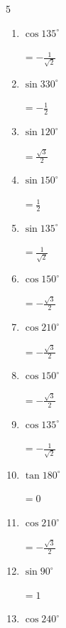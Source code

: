 \begin{multicols}{5}
\begin{enumerate}
  \item $\displaystyle \cos{135^\circ}$

        $\displaystyle =-\frac{1}{\sqrt{2}}$

  \item $\displaystyle \sin{330^\circ}$

        $\displaystyle =-\frac{1}{2}$

  \item $\displaystyle \sin{120^\circ}$

        $\displaystyle =\frac{\sqrt{3}}{2}$

  \item $\displaystyle \sin{150^\circ}$

        $\displaystyle =\frac{1}{2}$

  \item $\displaystyle \sin{135^\circ}$

        $\displaystyle =\frac{1}{\sqrt{2}}$

  \item $\displaystyle \cos{150^\circ}$

        $\displaystyle =-\frac{\sqrt{3}}{2}$

  \item $\displaystyle \cos{210^\circ}$

        $\displaystyle =-\frac{\sqrt{3}}{2}$

\columnbreak %

  \item $\displaystyle \cos{150^\circ}$

        $\displaystyle =-\frac{\sqrt{3}}{2}$

  \item $\displaystyle \cos{135^\circ}$

        $\displaystyle =-\frac{1}{\sqrt{2}}$

  \item $\displaystyle \tan{180^\circ}$

        $\displaystyle =0$

  \item $\displaystyle \cos{210^\circ}$

        $\displaystyle =-\frac{\sqrt{3}}{2}$

  \item $\displaystyle \sin{90^\circ}$

        $\displaystyle =1$

  \item $\displaystyle \cos{240^\circ}$


\end{enumerate}
\end{multicols}

